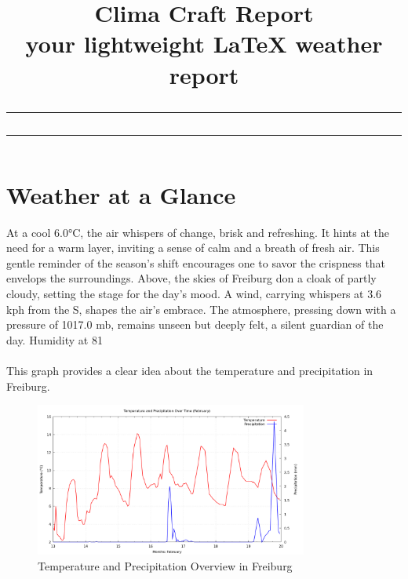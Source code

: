 \documentclass[12pt]{article}
\title{\vspace{-2cm} %
           \Huge\textbf{Clima Craft Report} \\ [0.5cm]  %
           \Large{your lightweight LaTeX weather report} %
           \vspace{0.5cm} \\ \hrule \vspace{-0.2cm} \hrule
    }
\author{}
\date{}
\begin{document}
    \maketitle
    \section*{Weather at a Glance }
At a cool 6.0°C, the air whispers of change, brisk and refreshing. It hints at the need for a warm layer, inviting a sense of calm and a breath of fresh air. This gentle reminder of the season's shift encourages one to savor the crispness that envelops the surroundings. Above, the skies of Freiburg don a cloak of partly cloudy, setting the stage for the day's mood. A wind, carrying whispers at 3.6 kph from the S, shapes the air's embrace. The atmosphere, pressing down with a pressure of 1017.0 mb, remains unseen but deeply felt, a silent guardian of the day. Humidity at 81%
\paragraph{}This graph provides a clear idea about the temperature and precipitation in Freiburg.
\begin{figure}[h]
\centering
\includegraphics[width=0.8\textwidth]{data/graph/temperature_precipitation_graph.png}
\caption{Temperature and Precipitation Overview in Freiburg}
\end{figure}
\end{document}
